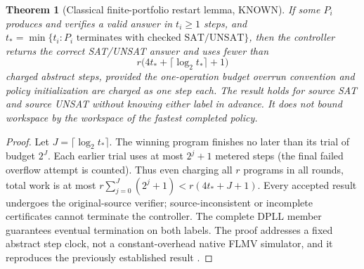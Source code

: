 \documentclass[11pt]{article}
\newtheorem{theorem}{Theorem}
\begin{document}
\begin{theorem}[Classical finite-portfolio restart lemma, KNOWN]\label{thm:race}
If some $P_i$ produces and verifies a valid answer in $t_i\ge1$ steps, and $t_* =\min\{t_i:\text{$P_i$ terminates with checked SAT/UNSAT}\}$, then the controller returns the correct SAT/UNSAT answer and uses fewer than
\[
 r\bigl(4t_*+\lceil\log_2 t_*\rceil+1\bigr)
\]
charged abstract steps, provided the one-operation budget overrun convention and policy initialization are charged as one step each. The result holds for source SAT and source UNSAT without knowing either label in advance. It does \emph{not} bound workspace by the workspace of the fastest completed policy.
\end{theorem}
\begin{proof}
Let $J=\lceil\log_2 t_*\rceil$. The winning program finishes no later than its trial of budget $2^J$. Each earlier trial uses at most $2^j+1$ metered steps (the final failed overflow attempt is counted). Thus even charging all $r$ programs in all rounds, total work is at most $r\sum_{j=0}^{J}(2^j+1)<r(4t_*+J+1)$. Every accepted result undergoes the original-source verifier; source-inconsistent or incomplete certificates cannot terminate the controller. The complete DPLL member guarantees eventual termination on both labels. The proof addresses a fixed abstract step clock, not a constant-overhead native FLMV simulator, and it reproduces the previously established result \cite{lspv255,lspv1262}.
\end{proof}
\end{document}
